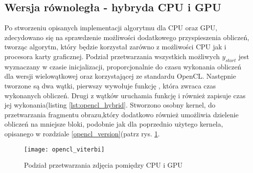 \documentclass[document.tex]{subfiles}
\begin{document}
\subsection{Wersja równoległa - hybryda CPU i GPU}
\indent Po stworzeniu opisanych implementacji algorytmu dla CPU oraz GPU, zdecydowano się
na sprawdzenie możliwości dodatkowego przyspieszenia obliczeń, tworząc algorytm, który będzie
korzystał zarówno z możliwości CPU jak i procesora karty graficznej. Podział przetwarzania
wszystkich możliwych $y_{start}$ jest wyznaczany w czasie inicjalizacji, proporcjonalnie do czasu
wykonania obliczeń dla wersji wielowątkowej oraz korzystającej ze standardu OpenCL. 
Następnie tworzone są dwa wątki, pierwszy wywołuje funkcję ,
która zwraca czas wykonanych obliczeń. Drugi z wątków uruchamia funkcję  i 
również zapisuje czas jej wykonania(listing \ref{lst:opencl_hybrid}. Stworzono osobny kernel, do przetwarzania fragmentu obrazu,który dodatkowo również umożliwia dzielenie obliczeń na mniejsze bloki, podobnie jak dla
poprzednio użytego kernela, opisanego w rozdziale \ref{opencl_version}(patrz rys. \ref{fig:hybrid_viterbi}.

 

\begin{figure}[h]
\texttt{[image: opencl\_viterbi]}
\caption{Podział przetwarzania zdjęcia pomiędzy CPU i GPU}
\label{fig:hybrid_viterbi}
\end{figure}
\end{document}
